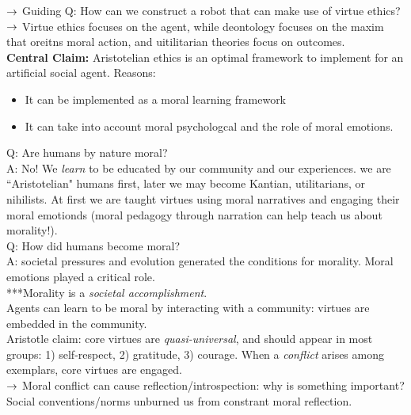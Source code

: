 $\rightarrow$ Guiding Q: How can we construct a robot that can make use of virtue ethics? \\

$\rightarrow$ Virtue ethics focuses on the agent, while deontology focuses on the maxim that oreitns moral action, and uitilitarian theories focus on outcomes. \\

{\bf Central Claim:} Aristotelian ethics is an optimal framework to implement for an artificial social agent. Reasons:
\begin{itemize}
	\item It can be implemented as a moral learning framework
	\item It can take into account moral psychologcal and the role of moral emotions.
\end{itemize}

Q: Are humans by nature moral? \\
A: No! We {\it learn} to be educated by our community and our experiences. we are ``Aristotelian" humans first, later we may become Kantian, utilitarians, or nihilists. At first we are taught virtues using moral narratives and engaging their moral emotionds (moral pedagogy through narration can help teach us about morality!). \\

Q: How did humans become moral? \\

A: societal pressures and evolution generated the conditions for morality. Moral emotions played a critical role. \\

***Morality is a {\it societal accomplishment}. \\

Agents can learn to be moral by interacting with a community: virtues are embedded in the community. \\

Aristotle claim: core virtues are {\it quasi-universal}, and should appear in most groups: 1) self-respect, 2) gratitude, 3) courage. When a {\it conflict} arises among exemplars, core virtues are engaged. \\

$\rightarrow$ Moral conflict can cause reflection/introspection: why is something important? Social conventions/norms unburned us from constrant moral reflection. \\

